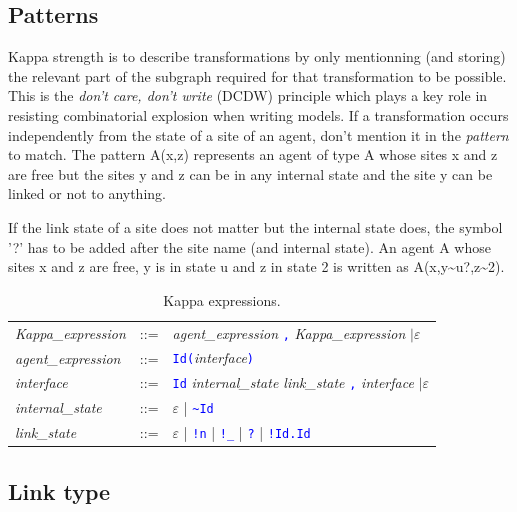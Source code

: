\documentclass[11pt]{book}
\def\intstate{\textasciitilde}
\def\tcb#1{\textcolor{blue}{\ttt{#1}}}
\def\ttt#1{\texttt{#1}}
\begin{document}
\subsection{Patterns}
Kappa strength is to describe transformations by only mentionning (and
storing) the relevant part of the subgraph required for that
transformation to be possible. This is the \emph{don't
  care, don't write} (DCDW) principle which  plays a key role in resisting combinatorial explosion when writing models. If a
transformation occurs independently from the state of a site of an
agent, don't mention it in the \emph{pattern} to match. The pattern
A(x,z) represents an agent of type A whose sites x and z are free but
the sites y and z can be in any internal state and the site y can be
linked or not to anything.

If the link state of a site does not matter but the internal state
does, the symbol '?' has to be added after the site name (and internal state).
An agent A whose sites x and z are free, y is in state u and z in
state 2 is written as A(x,y\intstate{}u?,z\intstate{}2).

\begin{table}[ht!]
  \centering
  \caption{Kappa expressions.}
  \begin{tabular}{@{} lcl @{}}
    \textit{Kappa\_expression} & ::= & \textit{agent\_expression} \tcb{,} \textit{Kappa\_expression} $\mid\varepsilon$ \\
    \textit{agent\_expression} & ::= &  \tcb{Id}\tcb{(}\textit{interface}\tcb{)} \\
    \textit{interface} &::=& \tcb{Id} \textit{internal\_state link\_state}  \tcb{,} \textit{interface} $\mid\varepsilon$ \\
    \textit{internal\_state} &::=& $\varepsilon$ | \tcb{\intstate Id} \\
    \textit{link\_state} &::=& $\varepsilon$ | \tcb{!n} | \tcb{!\_} | \tcb{?}  | \tcb{!Id.Id} \\
    \end{tabular}
  \label{tab:patterns}
\end{table}

\subsection{Link type}
\end{document}
